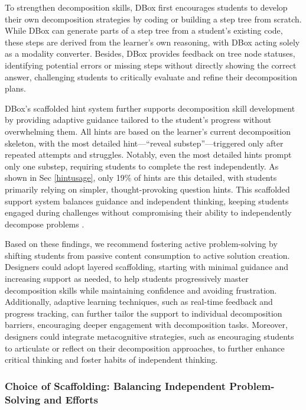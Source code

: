 {To strengthen decomposition skills, DBox first encourages students to develop their own decomposition strategies by coding or building a step tree from scratch. While DBox can generate parts of a step tree from a student's existing code, these steps are derived from the learner's own reasoning, with DBox acting solely as a modality converter. Besides, DBox provides feedback on tree node statuses, identifying potential errors or missing steps without directly showing the correct answer, challenging students to critically evaluate and refine their decomposition plans.


DBox's scaffolded hint system further supports decomposition skill development by providing adaptive guidance tailored to the student’s progress without overwhelming them. All hints are based on the learner's current decomposition skeleton, with the most detailed hint—``reveal substep''—triggered only after repeated attempts and struggles. Notably, even the most detailed hints prompt only one substep, requiring students to complete the rest independently. As shown in Sec \ref{hintusage}, only 19\% of hints are this detailed, with students primarily relying on simpler, thought-provoking question hints. This scaffolded support system balances guidance and independent thinking, keeping students engaged during challenges without compromising their ability to independently decompose problems \cite{kinnunen2006students}.

Based on these findings, we recommend fostering active problem-solving by shifting students from passive content consumption to active solution creation. Designers could adopt layered scaffolding, starting with minimal guidance and increasing support as needed, to help students progressively master decomposition skills while maintaining confidence and avoiding frustration. Additionally, adaptive learning techniques, such as real-time feedback and progress tracking, can further tailor the support to individual decomposition barriers, encouraging deeper engagement with decomposition tasks. Moreover, designers could integrate metacognitive strategies, such as encouraging students to articulate or reflect on their decomposition approaches, to further enhance critical thinking and foster habits of independent thinking.




\subsubsection{\textbf{Choice of Scaffolding: Balancing Independent Problem-Solving and Efforts}}

}
